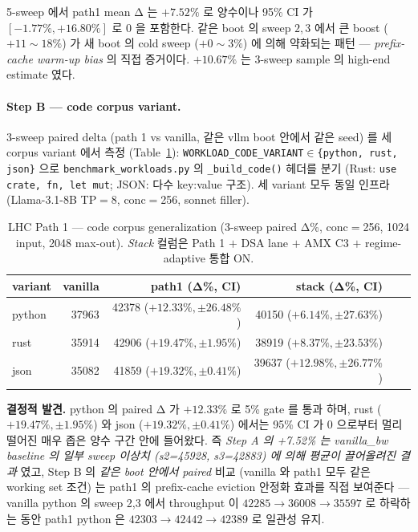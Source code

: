 {5-sweep 에서 path1 mean Δ 는 $+7.52\%$ 로 양수이나 95\% CI 가 $[-1.77\%, +16.80\%]$
로 $0$ 을 포함한다. 같은 boot 의 sweep $2,3$ 에서 큰 boost ($+11{\sim}18\%$)
가 새 boot 의 cold sweep ($+0{\sim}3\%$) 에 의해 약화되는 패턴 —
\emph{prefix-cache warm-up bias} 의 직접 증거이다. $+10.67\%$ 는 3-sweep
sample 의 high-end estimate 였다.

\paragraph{Step B — code corpus variant.}
3-sweep paired delta (path 1 vs vanilla, 같은 vllm boot 안에서 같은 seed)
를 세 corpus variant 에서 측정 (Table~\ref{tbl:lhc-code-variant}):
\texttt{WORKLOAD\_CODE\_VARIANT$\in$\{python, rust, json\}} 으로
\texttt{benchmark\_workloads.py} 의 \texttt{\_build\_code()} 헤더를 분기
(Rust: \texttt{use crate, fn, let mut}; JSON: 다수 key:value 구조).
세 variant 모두 동일 인프라 (Llama-3.1-8B TP$=$8, conc$=$256, sonnet filler).

\begin{table}[t]
\centering
\small
\caption{LHC Path 1 — code corpus generalization (3-sweep paired Δ\%,
conc$=$256, 1024 input, 2048 max-out). \emph{Stack} 컬럼은 Path 1 $+$
DSA lane $+$ AMX C3 $+$ regime-adaptive 통합 ON.}
\label{tbl:lhc-code-variant}
\begin{tabular}{lrrrrr}
\toprule
variant & vanilla & path1 (Δ\%, CI) & stack (Δ\%, CI) \\
\midrule
python & 37963 & 42378 ($+12.33\%, \pm 26.48\%$) & 40150 ($+6.14\%, \pm 27.63\%$) \\
rust   & 35914 & 42906 ($+19.47\%, \pm 1.95\%$)  & 38919 ($+8.37\%, \pm 23.53\%$) \\
json   & 35082 & 41859 ($+19.32\%, \pm 0.41\%$)  & 39637 ($+12.98\%, \pm 26.77\%$) \\
\bottomrule
\end{tabular}
\end{table}

\textbf{결정적 발견.} python 의 paired Δ 가 $+12.33\%$ 로 5\% gate 를 통과
하며, rust ($+19.47\%, \pm 1.95\%$) 와 json ($+19.32\%, \pm 0.41\%$) 에서는
95\% CI 가 0 으로부터 멀리 떨어진 매우 좁은 양수 구간 안에 들어왔다.
즉 \emph{Step A 의 +7.52\% 는 vanilla\_bw baseline 의 일부 sweep 이상치
(s2=45928, s3=42883) 에 의해 평균이 끌어올려진 결과} 였고, Step B 의
\emph{같은 boot 안에서 paired} 비교 (vanilla 와 path1 모두 같은 working set
조건) 는 path1 의 prefix-cache eviction 안정화 효과를 직접 보여준다 ---
vanilla python 의 sweep 2,3 에서 throughput 이 $42285 \to 36008 \to 35597$
로 하락하는 동안 path1 python 은 $42303 \to 42442 \to 42389$ 로
일관성 유지.

}
